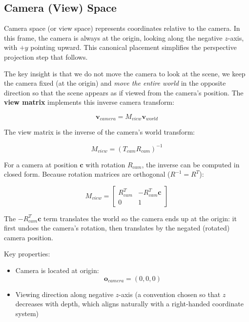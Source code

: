 \documentclass[11pt]{article}
\begin{document}
\subsection{Camera (View) Space}

Camera space (or view space) represents coordinates relative to the camera. In this frame, the camera is always at the origin, looking along the negative $z$-axis, with $+y$ pointing upward. This canonical placement simplifies the perspective projection step that follows.

The key insight is that we do not move the camera to look at the scene, we keep the camera fixed (at the origin) and \emph{move the entire world} in the opposite direction so that the scene appears as if viewed from the camera's position. The \textbf{view matrix} implements this inverse camera transform:

\begin{equation}
    \mathbf{v}_{camera} = M_{view} \mathbf{v}_{world}
\end{equation}

The view matrix is the inverse of the camera's world transform:

\begin{equation}
    M_{view} = (T_{cam} R_{cam})^{-1}
\end{equation}

For a camera at position $\mathbf{c}$ with rotation $R_{cam}$, the inverse can be computed in closed form. Because rotation matrices are orthogonal ($R^{-1} = R^T$):

\begin{equation}
    M_{view} =
    \begin{bmatrix}
        R_{cam}^T & -R_{cam}^T \mathbf{c} \\
        0 & 1
    \end{bmatrix}
\end{equation}

The $-R_{cam}^T \mathbf{c}$ term translates the world so the camera ends up at the origin: it first undoes the camera's rotation, then translates by the negated (rotated) camera position.

Key properties:

\begin{itemize}
    \item Camera is located at origin:
    \begin{equation}
        \mathbf{o}_{camera} = (0,0,0)
    \end{equation}
    \item Viewing direction along negative $z$-axis (a convention chosen so that $z$ decreases with depth, which aligns naturally with a right-handed coordinate system)
\end{itemize}
\end{document}

